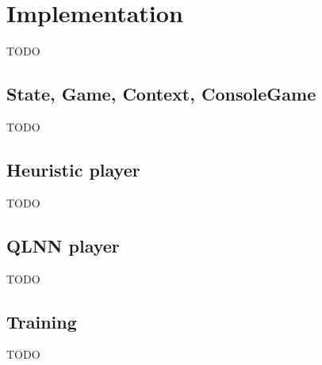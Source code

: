 \chapter{Implementation}\label{chap:4}
TODO

\section{State, Game, Context, ConsoleGame}
TODO

\section{Heuristic player}
TODO

\section{QLNN player}
TODO

\section{Training}
TODO
